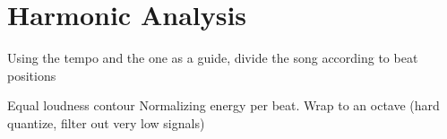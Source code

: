 \section{Harmonic Analysis}
Using the tempo and the one as a guide,
divide the song according to beat positions

Equal loudness contour
Normalizing energy per beat.
Wrap to an octave (hard quantize, filter out very low signals)
